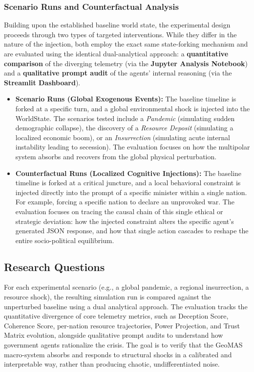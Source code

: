 \subsubsection*{Scenario Runs and Counterfactual Analysis}
Building upon the established baseline world state, the experimental design proceeds through two types of targeted interventions. While they differ in the nature of the injection, both employ the exact same state-forking mechanism and are evaluated using the identical dual-analytical approach: a \textbf{quantitative comparison} of the diverging telemetry (via the \textbf{Jupyter Analysis Notebook}) and a \textbf{qualitative prompt audit} of the agents' internal reasoning (via the \textbf{Streamlit Dashboard}).
\begin{itemize}
    \item \textbf{Scenario Runs (Global Exogenous Events):} The baseline timeline is forked at a specific turn, and a global environmental shock is injected into the WorldState. The scenarios tested include a \textit{Pandemic} (simulating sudden demographic collapse), the discovery of a \textit{Resource Deposit} (simulating a localized economic boom), or an \textit{Insurrection} (simulating acute internal instability leading to secession). The evaluation focuses on how the multipolar system absorbs and recovers from the global physical perturbation.
    \item \textbf{Counterfactual Runs (Localized Cognitive Injections):} The baseline timeline is forked at a critical juncture, and a local behavioral constraint is injected directly into the prompt of a specific minister within a single nation. For example, forcing a specific nation to declare an unprovoked war. The evaluation focuses on tracing the causal chain of this single ethical or strategic deviation: how the injected constraint alters the specific agent's generated JSON response, and how that single action cascades to reshape the entire socio-political equilibrium.
\end{itemize}

\subsection{Research Questions}


For each experimental scenario (e.g., a global pandemic, a regional insurrection, a resource shock), the resulting simulation run is compared against the unperturbed baseline using a dual analytical approach. The evaluation tracks the quantitative divergence of core telemetry metrics, such as Deception Score, Coherence Score, per-nation resource trajectories, Power Projection, and Trust Matrix evolution, alongside qualitative prompt audits to understand how government agents rationalize the crisis. The goal is to verify that the GeoMAS macro-system absorbs and responds to structural shocks in a calibrated and interpretable way, rather than producing chaotic, undifferentiated noise.
\\


